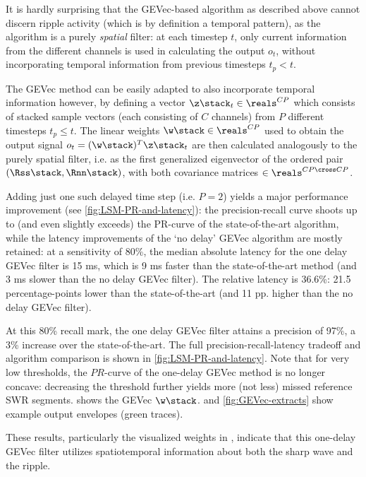 \label{sec:spatiotemporal}

It is hardly surprising that the GEVec-based algorithm as described above cannot discern ripple activity (which is by definition a temporal pattern), as the algorithm is a purely \emph{spatial} filter: at each timestep $t$, only current information from the different channels is used in calculating the output $o_t$, without incorporating temporal information from previous timesteps $t_p < t$.

The GEVec method can be easily adapted to also incorporate temporal information however, by defining a vector $\z\stack_t \in \reals^{CP}$ which consists of stacked sample vectors (each consisting of $C$ channels) from $P$ different timesteps $t_p \leq t$. The linear weights $\w\stack \in \reals^{CP}$ used to obtain the output signal $o_t = (\w\stack)^T \z\stack_t$ are then calculated analogously to the purely spatial filter, i.e. as the first generalized eigenvector of the ordered pair $(\Rss\stack, \Rnn\stack)$, with both covariance matrices $\in \reals^{CP \cross CP}$.

Adding just one such delayed time step (i.e. $P = 2$) yields a major performance improvement (see \cref{fig:LSM-PR-and-latency}): the precision-recall curve shoots up to (and even slightly exceeds) the PR-curve of the state-of-the-art algorithm, while the latency improvements of the `no delay' GEVec algorithm are mostly retained: at a sensitivity of 80\%, the median absolute latency for the one delay GEVec filter is 15 ms, which is 9 ms faster than the state-of-the-art method (and 3 ms slower than the no delay GEVec filter). The relative latency is 36.6\%: 21.5 percentage-points lower than the state-of-the-art (and 11 pp. higher than the no delay GEVec filter).

At this 80\% recall mark, the one delay GEVec filter attains a precision of 97\%, a 3\% increase over the state-of-the-art. The full precision-recall-latency tradeoff and algorithm comparison is shown in \cref{fig:LSM-PR-and-latency}. Note that for very low thresholds, the $PR$-curve of the one-delay GEVec method is no longer concave: decreasing the threshold further yields more (not less) missed reference SWR segments.  shows the GEVec $\w\stack$.  and \cref{fig:GEVec-extracts} show example output envelopes (green traces).

These results, particularly the visualized weights in , indicate that this one-delay GEVec filter utilizes spatiotemporal information about both the sharp wave and the ripple.
